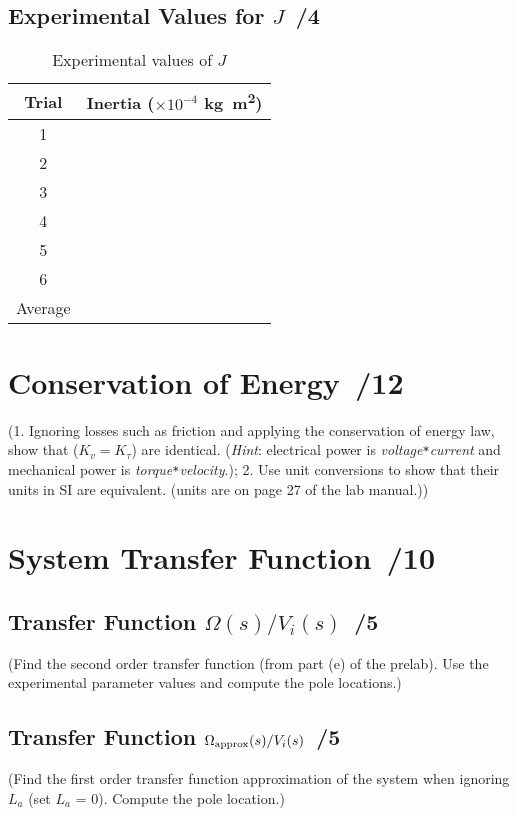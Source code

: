 \documentclass{article}
\newcommand{\score}{\hfill \underline{\hspace{0.65cm}}\,/} %
\begin{document}
\subsection{Experimental Values for $J$ \score 4}
\begin{table}[phtb] 
\begin{center}
\caption{Experimental values of $J$}
\label{tbl:lab4_q5}
\begin{tabular}{c|l}\hline \hline
\cellcolor{lightgray} Trial & \cellcolor{lightgray} Inertia ($\times10^{-4}$ \si{\kg\m\squared}) \\
\hline
1 &  \\ \hline
2 &  \\ \hline
3 &  \\ \hline
4 &  \\ \hline
5 &  \\ \hline
6 &  \\ \hline
Average &  \\ \hline
\end{tabular}
\end{center}
\end{table}

\section{Conservation of Energy \score 12}
(1. Ignoring losses such as friction and applying the conservation of energy law, show that ($K_v=K_{\tau}$) are identical. (\emph{Hint}: electrical power is \emph{voltage}\verb|*|\emph{current} and mechanical power is \emph{torque}\verb|*|\emph{velocity}.); 2. Use unit conversions to show that their units in SI are equivalent. (units are on page 27 of the lab manual.))

\section{System Transfer Function \score 10}
\subsection{Transfer Function $\Omega(s)/V_i(s)$ \score 5}
(Find the second order transfer function (from part (e) of the prelab). Use the experimental parameter values and compute the pole locations.)

\subsection{Transfer Function $\Omega_{\rm approx}(s)/V_i(s)$ \score 5}
(Find the first order transfer function approximation of the system when ignoring $L_a$ (set $L_a$ = 0). Compute the pole location.)
\end{document}
